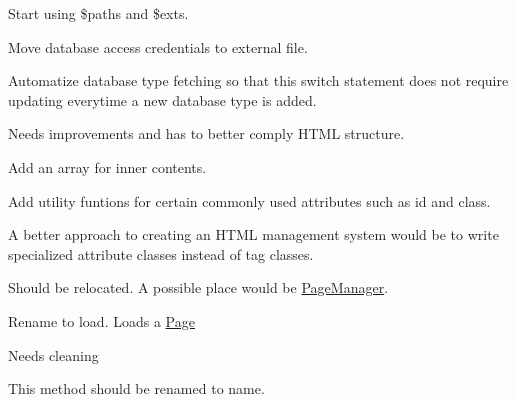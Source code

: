 
\begin{DoxyRefList}
\item[\label{todo__todo000001}%
\Hypertarget{todo__todo000001}%
Class \hyperlink{class_lora_1_1_configuration}{Configuration} ]Start using \$paths and \$exts.  
\item[\label{todo__todo000002}%
\Hypertarget{todo__todo000002}%
Class \hyperlink{class_d_b_connection}{D\+B\+Connection} ]Move database access credentials to external file.  
\item[\label{todo__todo000003}%
\Hypertarget{todo__todo000003}%
Global \hyperlink{class_d_b_connection_a1191ef26fe6381a3bfbd33c0c6f7b9f4}{D\+B\+Connection\+:\+:connect} (array \&\$db)]Automatize database type fetching so that this switch statement does not require updating everytime a new database type is added.  
\item[\label{todo__todo000012}%
\Hypertarget{todo__todo000012}%
Class \hyperlink{class_html_1_1_html_tag}{Html\+Tag} ]Needs improvements and has to better comply H\+T\+ML structure.
\begin{DoxyItemize}
\item Add an array for inner contents.
\item Add utility funtions for certain commonly used attributes such as id and class.
\item A better approach to creating an H\+T\+ML management system would be to write specialized attribute classes instead of tag classes.  
\end{DoxyItemize}
\item[\label{todo__todo000007}%
\Hypertarget{todo__todo000007}%
Global \hyperlink{class_lora_1_1_page_a9caaa1f5ea6177e55f13ebe7dec2bd60}{Page\+:\+:finalize} ()]Should be relocated. A possible place would be \hyperlink{class_lora_1_1_page_manager}{Page\+Manager}.  
\item[\label{todo__todo000006}%
\Hypertarget{todo__todo000006}%
Global \hyperlink{class_lora_1_1_page_a943f0df56a6f8dbc260ddb31925ce4f6}{Page\+:\+:load\+View} (string \$view)]Rename to load. Loads a \hyperlink{class_lora_1_1_page}{Page}  
\item[\label{todo__todo000008}%
\Hypertarget{todo__todo000008}%
Global \hyperlink{class_lora_1_1_page_a49b28f2ca7604e14af0d5829b4e8cc4a}{Page\+:\+:parse\+Views} (array \$views)]Needs cleaning  
\item[\label{todo__todo000009}%
\Hypertarget{todo__todo000009}%
Global \hyperlink{class_lora_1_1_page_view_a087060b582403885d08e89ad894ecc5d}{Page\+View\+:\+:id} ()]This method should be renamed to \textquotesingle{}name\textquotesingle{}.  

\end{DoxyRefList}
